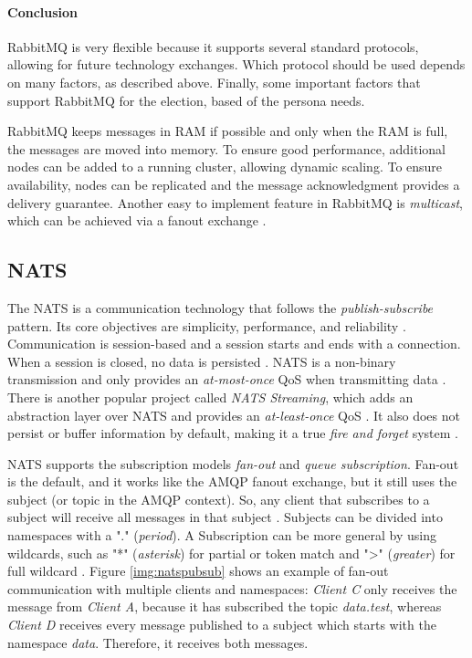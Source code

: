 \paragraph{Conclusion}

RabbitMQ is very flexible because it supports several standard protocols, allowing for future technology exchanges.
Which protocol should be used depends on many factors, as described above.
Finally, some important factors that support RabbitMQ for the election, based of the persona needs.

RabbitMQ keeps messages in \ac{RAM} if possible and only when the \ac{RAM} is full, the messages are moved into memory.
To ensure good performance, additional nodes can be added to a running cluster, allowing dynamic scaling.
To ensure availability, nodes can be replicated and the message acknowledgment provides a delivery guarantee.
Another easy to implement feature in RabbitMQ is \textit{multicast}, which can be achieved via a fanout exchange \cite[p.~230ff.]{Dobbelaere.2017}.

\subsection{NATS}\label{cha:Technologies:communication:nats}

The \acf{NATS} is a communication technology that follows the \textit{publish-subscribe} pattern.
Its core objectives are simplicity, performance, and reliability \cite[p.~8]{Quevedo.2018}.
Communication is session-based and a session starts and ends with a connection.
When a session is closed, no data is persisted \cite[p.~3]{Quevedo.2018}.
\ac{NATS} is a non-binary transmission and only provides an \textit{at-most-once} \ac{QoS} when transmitting data \cite[p.~20]{Quevedo.2018}.
There is another popular project called \textit{NATS Streaming}, which adds an abstraction layer over \ac{NATS} and provides an \textit{at-least-once} \ac{QoS} \cite[p.~10f.]{Quevedo.2018}.
It also does not persist or buffer information by default, making it a true \textit{fire and forget} system \cite[p.~8]{Quevedo.2018}.

\ac{NATS} supports the subscription models \textit{fan-out} and \textit{queue subscription}.
Fan-out is the default, and it works like the \ac{AMQP} fanout exchange, but it still uses the subject (or topic in the \ac{AMQP} context).
So, any client that subscribes to a subject will receive all messages in that subject \cite[p.~6]{Quevedo.2018}.
Subjects can be divided into namespaces with a "." (\textit{period}).
A Subscription can be more general by using wildcards, such as "*" (\textit{asterisk}) for partial or token match and ">" (\textit{greater}) for full wildcard \cite[p.~31]{Quevedo.2018}.
Figure \ref{img:natspubsub} shows an example of fan-out communication with multiple clients and namespaces:
\textit{Client C} only receives the message from \textit{Client A}, because it has subscribed the topic \textit{data.test}, whereas \textit{Client D} receives every message published to a subject which starts with the namespace \textit{data}.
Therefore, it receives both messages.

